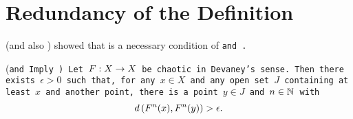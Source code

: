 \documentclass[10pt,draft,twoside]{book}
\begin{document}

\section{Redundancy of the Definition}
\citet{silverman} (and also \citet{banks}) showed that \sdic is a necessary condition of \tt and \dpp.
\begin{theorem}
  (\tt and \dpp Imply \sdic)
  Let $F: X\rightarrow X$ be chaotic in Devaney's sense.
  Then there exists $\epsilon > 0$ such that, for any $x\in X$ and any open set $J$ containing at least $x$ and another point, there is a point $y\in J$ and $n\in \mathbb{N}$ with
  \begin{equation*}
    d\left( F^{n}(x),F^{n}(y) \right) > \epsilon.
  \end{equation*}
  \label{thm:silverman}
\end{theorem}
\end{document}
